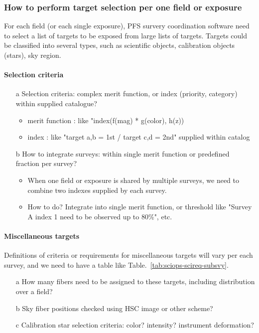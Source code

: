 \documentclass[a4paper,notitlepage]{article}
\newcommand{\coll}[1]{\textcolor{ccoll}{#1}}
\begin{document}
\subsubsection{How to perform target selection per one field or exposure}

For each field (or each single exposure), PFS survery coordination software 
need to select a list of targets to be exposed from large lists of targets. 
Targets could be classified into several types, such as scientific objects, 
calibration objects (stars), sky region. 

\paragraph{Selection criteria}

\begin{enumerate}
  \item[\coll{a}] Selection criteria: complex merit function, or index (priority, 
    category) within supplied catalogue?
    \begin{itemize}
      \item merit function : like "index(f(mag) * g(color), h(z))
      \item index : like "target a,b = 1st / target c,d = 2nd" supplied within 
        catalog
    \end{itemize}
  \item[\coll{b}] How to integrate surveys: within single merit function or predefined 
    fraction per survey?
    \begin{itemize}
      \item When one field or exposure is shared by multiple surveys, we need 
        to combine two indexes supplied by each survey.
      \item How to do? Integrate into single merit function, or threshold like 
        "Survey A index 1 need to be observed up to 80\%", etc.
    \end{itemize}
\end{enumerate}

\paragraph{Miscellaneous targets}

Definitions of criteria or requirements for miscellaneous targets will 
vary per each survey, and we need to have a table like 
Table.~\ref{tab:sciops-scireq-subsvy}. 

\begin{enumerate}
  \item[a] How many fibers need to be assigned to these targets, including 
    distribution over a field? 
  \item[b] Sky fiber positions checked using HSC image or other scheme?
  \item[c] Calibration star selection criteria: color? intensity? instrument deformation?
\end{enumerate}
\end{document}
